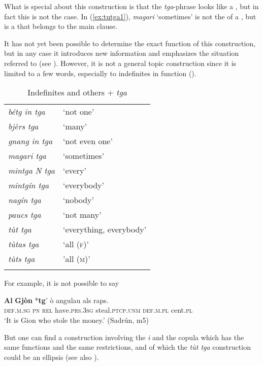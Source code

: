 What is special about this construction is that the \textit{tga}-phrase looks like a , but in fact this is not the case. In (\ref{ex:tutga1}), \textit{magari} `sometimes' is not the  of a , but is a  that belongs to the main clause.

It has not yet been possible to determine the exact function of this construction, but in any case it introduces new information and emphasizes the situation referred to (see \citealt[195--198]{Linder1987}). However, it is not a general topic construction since it is limited to a few words, especially to indefinites in  function ().

\begin{table}
	\caption{Indefinites and others + \textit{tga}}
	\label{indefinitetga}
	\begin{tabular}{ll}
		\lsptoprule
				\textit{bétg in tga} & `not one'\\
		\textit{bjèrs tga} & `many'\\
		\textit{gnang in tga} & `not even one'\\
		\textit{magari tga} & `sometimes'\\
		\textit{mintga N tga} & `every'\\
		\textit{mintgín tga} & `everybody'\\
		\textit{nagín tga} & `nobody'\\
		\textit{paucs tga} & `not many'\\
		\textit{tùt tga} & `everything, everybody'\\
		\textit{tùtas tga} & `all (\textsc{f})'\\
		\textit{tùts tga} & 'all (\textsc{m})'\\
		\lspbottomrule
	\end{tabular}
\end{table}

For example, it is not possible to say

\ea
\gll \textbf{Al} \textbf{Gjòn} *\textbf{tg}' ò angulau als raps.\\
\textsc{def.m.sg} \textsc{pn} \textsc{rel} have.\textsc{prs.3sg} steal.\textsc{ptcp.unm} \textsc{def.m.pl} cent.\textsc{pl}\\
\glt `It is Gion who stole the money.' (Sadrún, m5)
\z

But one can find a construction involving the  \textit{i} and the copula which has the same functions and the same restrictions, and of which the \textit{tùt tga} construction could be an ellipsis (see also  \citealt[201]{Linder1987}).

